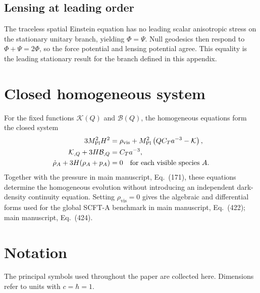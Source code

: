 \documentclass[aps,prd,reprint,onecolumn,notitlepage,nofootinbib,longbibliography,floatfix]{revtex4-2}
\theoremstyle{scstyle}
\theoremstyle{definition}
\theoremstyle{remark}
\newcommand{\mpl}{M_{\rm Pl}}
\newcommand{\cK}{\mathcal K}
\newcommand{\cB}{\mathcal B}
\newcommand{\vis}{\mathrm{vis}}
\begin{document}
\subsection{Lensing at leading order}

The traceless spatial Einstein equation has no leading scalar anisotropic stress on the stationary unitary branch, yielding $\Phi=\Psi$. Null geodesics then respond to $\Phi+\Psi=2\Phi$, so the force potential and lensing potential agree. This equality is the leading stationary result for the branch defined in this appendix.

\section{Closed homogeneous system}
\label{app:closedbackground}

For the fixed functions $\cK(Q)$ and $\cB(Q)$, the homogeneous equations form the closed system
\begin{align}
3\mpl^2H^2&=\rho_{\vis}+\mpl^2\left(QC_Ta^{-3}-\cK\right),
\label{eq:closed1}\\
\cK_{,Q}+3H\cB_{,Q}&=C_Ta^{-3},
\label{eq:closed2}\\
\dot\rho_A+3H(\rho_A+p_A)&=0
\quad\text{for each visible species }A.
\label{eq:closed3}
\end{align}
Together with the pressure in main manuscript, Eq.~(171), these equations determine the homogeneous evolution without introducing an independent dark-density continuity equation. Setting $\rho_{\vis}=0$ gives the algebraic and differential forms used for the global SCFT-A benchmark in main manuscript, Eq.~(422); main manuscript, Eq.~(424).
\section{Notation}
\label{app:notation}

The principal symbols used throughout the paper are collected here. Dimensions refer to units with $c=\hbar=1$.
\end{document}

